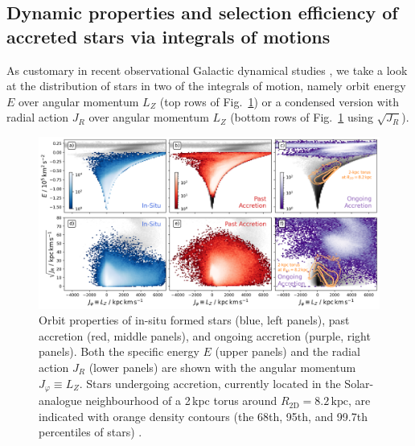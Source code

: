 \documentclass[fleqn,usenatbib]{mnras}
\begin{document}
\subsection{Dynamic properties and selection efficiency of accreted stars via integrals of motions} \label{sec:analysis_dynamic_properties}

As customary in recent observational Galactic dynamical studies \citep[for example][]{Helmi2018, Trick2019, Helmi2020, Buder2022}, we take a look at the distribution of stars in two of the integrals of motion, namely orbit energy $E$ over angular momentum $L_Z$ (top rows of Fig.~\ref{fig:lz_e_jr}) or a condensed version with radial action $J_R$ over angular momentum $L_Z$ (bottom rows of Fig.~\ref{fig:lz_e_jr} using $\sqrt{J_R}$).

\begin{figure}
    \centering
    \includegraphics[width=\textwidth]{figures/lz_e_jr.png}
    \caption{Orbit properties of in-situ formed stars (blue, left panels), past accretion (red, middle panels), and ongoing accretion (purple, right panels). Both the specific energy $E$ (upper panels) and the radial action $J_R$ (lower panels) are shown with the angular momentum $J_\varphi \equiv L_Z$. Stars undergoing accretion, currently located in the Solar-analogue neighbourhood of a 2\,kpc torus around $R_\mathrm{2D} = 8.2\,\mathrm{kpc}$, are indicated with orange density contours (the 68th, 95th, and 99.7th percentiles of stars) \href{https://github.com/svenbuder/gse_nihaouhd/tree/main/figures}{\faGithub}.
    \label{fig:lz_e_jr}}
\end{figure}
\end{document}
